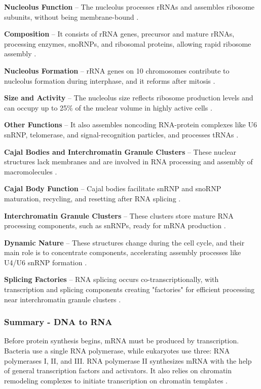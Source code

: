 \textbf{Nucleolus Function} – The nucleolus processes rRNAs and assembles ribosome subunits, without being membrane-bound \cite*{L1-Chapter6}.

\textbf{Composition} – It consists of rRNA genes, precursor and mature rRNAs, processing enzymes, snoRNPs, and ribosomal proteins, allowing rapid ribosome assembly \cite*{L1-Chapter6}.

\textbf{Nucleolus Formation} – rRNA genes on 10 chromosomes contribute to nucleolus formation during interphase, and it reforms after mitosis \cite*{L1-Chapter6}.

\textbf{Size and Activity} – The nucleolus size reflects ribosome production levels and can occupy up to 25\% of the nuclear volume in highly active cells \cite*{L1-Chapter6}.

\textbf{Other Functions} – It also assembles noncoding RNA-protein complexes like U6 snRNP, telomerase, and signal-recognition particles, and processes tRNAs \cite*{L1-Chapter6}.

\textbf{Cajal Bodies and Interchromatin Granule Clusters} – These nuclear structures lack membranes and are involved in RNA processing and assembly of macromolecules \cite*{L1-Chapter6}.

\textbf{Cajal Body Function} – Cajal bodies facilitate snRNP and snoRNP maturation, recycling, and resetting after RNA splicing \cite*{L1-Chapter6}.

\textbf{Interchromatin Granule Clusters} – These clusters store mature RNA processing components, such as snRNPs, ready for mRNA production \cite*{L1-Chapter6}.

\textbf{Dynamic Nature} – These structures change during the cell cycle, and their main role is to concentrate components, accelerating assembly processes like U4/U6 snRNP formation \cite*{L1-Chapter6}.

\textbf{Splicing Factories} – RNA splicing occurs co-transcriptionally, with transcription and splicing components creating "factories" for efficient processing near interchromatin granule clusters \cite*{L1-Chapter6}.

\subsubsection{Summary - DNA to RNA}
Before protein synthesis begins, mRNA must be produced by transcription. Bacteria use a single RNA polymerase, while eukaryotes use three: RNA polymerases I, II, and III. RNA polymerase II synthesizes mRNA with the help of general transcription factors and activators. It also relies on chromatin remodeling complexes to initiate transcription on chromatin templates \cite*{L1-Chapter6}.

